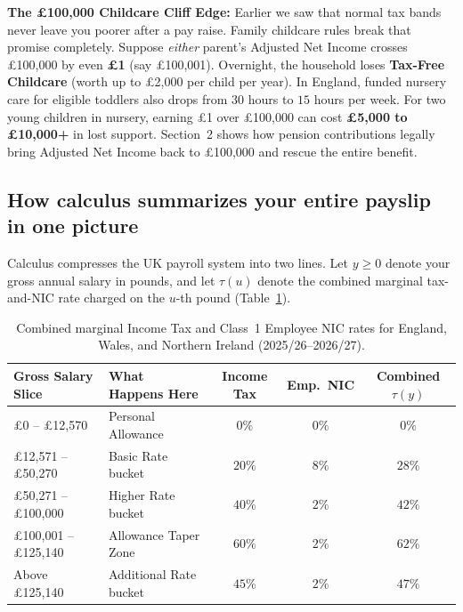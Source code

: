 \begin{trapbox}
\textbf{The \pounds 100,000 Childcare Cliff Edge:} Earlier we saw that normal tax bands never leave you poorer after a pay raise. Family childcare rules break that promise completely. Suppose \emph{either} parent's Adjusted Net Income crosses \pounds 100,000 by even \textbf{\pounds 1} (say \pounds 100,001). Overnight, the household loses \textbf{Tax-Free Childcare} (worth up to \pounds 2,000 per child per year). In England, funded nursery care for eligible toddlers also drops from $30$ hours to $15$ hours per week. For two young children in nursery, earning \pounds 1 over \pounds 100,000 can cost \textbf{\pounds 5,000 to \pounds 10,000+} in lost support. Section~2 shows how pension contributions legally bring Adjusted Net Income back to \pounds 100,000 and rescue the entire benefit.
\end{trapbox}

\subsection{How calculus summarizes your entire payslip in one picture}

Calculus compresses the UK payroll system into two lines. Let $y \ge 0$ denote your gross annual salary in pounds, and let $\tau(u)$ denote the combined marginal tax-and-NIC rate charged on the $u$-th pound (Table~\ref{tab:uk-marginal-bands}).

\begin{table}[ht]
\centering
\small
\begin{tabular}{llccc}
\toprule
\textbf{Gross Salary Slice} & \textbf{What Happens Here} & \textbf{Income Tax} & \textbf{Emp.\ NIC} & \textbf{Combined $\tau(y)$} \\
\midrule
\pounds 0 -- \pounds 12,570 & Personal Allowance & $0\%$ & $0\%$ & $0\%$ \\
\pounds 12,571 -- \pounds 50,270 & Basic Rate bucket & $20\%$ & $8\%$ & $28\%$ \\
\pounds 50,271 -- \pounds 100,000 & Higher Rate bucket & $40\%$ & $2\%$ & $42\%$ \\
\pounds 100,001 -- \pounds 125,140 & Allowance Taper Zone & $60\%$ & $2\%$ & $62\%$ \\
Above \pounds 125,140 & Additional Rate bucket & $45\%$ & $2\%$ & $47\%$ \\
\bottomrule
\end{tabular}
\caption{Combined marginal Income Tax and Class~1 Employee NIC rates for England, Wales, and Northern Ireland (2025/26--2026/27).}
\label{tab:uk-marginal-bands}
\end{table}

